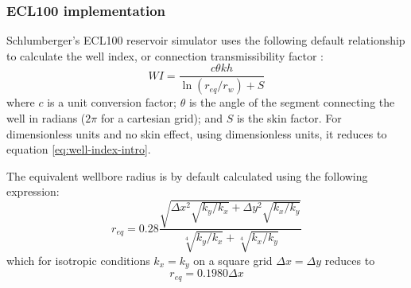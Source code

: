 \subsubsection{ECL100 implementation} %
\label{ssub:ecl100_implementation}
Schlumberger's ECL100 reservoir simulator uses the following default relationship to calculate the well index, or connection transmissibility factor \cite{Schlumberger2013Eclipse}:
\begin{equation}
    WI = \frac{c\theta k h}{\ln \left(r_{eq}/r_w\right)+S}
\end{equation}
where $c$ is a unit conversion factor; $\theta$ is the angle of the segment connecting the well in radians ($2\pi$ for a cartesian grid); and $S$ is the skin factor. For dimensionless units and no skin effect, using dimensionless units, it reduces to equation \eqref{eq:well-index-intro}.

The equivalent wellbore radius is by default calculated using the following expression:
\begin{equation}
    r_{eq} = 0.28 \frac{\sqrt{\Delta x^2 \sqrt{k_y/k_x} + \Delta y^2 \sqrt{k_x/k_y}}}{\sqrt[4]{k_y/k_x}+\sqrt[4]{k_x/k_y}}
\end{equation}
which for isotropic conditions $k_x=k_y$ on a square grid $\Delta x= \Delta y$ reduces to
\begin{equation}
    r_{eq} = 0.1980 \Delta x
\end{equation}


